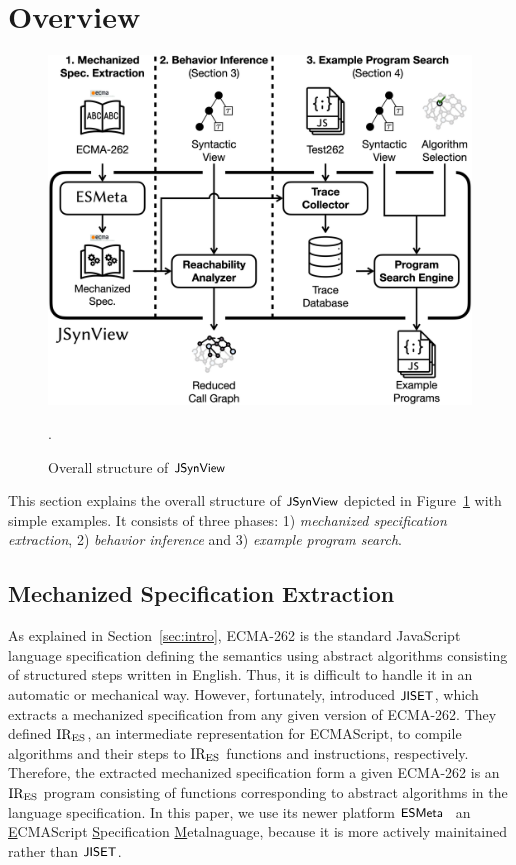 \section{Overview}\label{sec:overview}

\begin{figure}
  \centering
  \includegraphics[width=\columnwidth]{img/overall.png}
  \caption{Overall structure of $\textsf{\small JSynView}$}
  \vspace*{-1em}
  \label{fig:overall}.
\end{figure}

This section explains the overall structure of $\textsf{\small JSynView}$ depicted in
Figure~\ref{fig:overall} with simple examples.  It consists of three phases: 1)
\textit{mechanized specification extraction}, 2) \textit{behavior inference} and
3) \textit{example program search}.

\subsection{Mechanized Specification Extraction}\label{sec:extract-spec}

As explained in Section~\ref{sec:intro}, ECMA-262 is the standard JavaScript
language specification defining the semantics using abstract algorithms
consisting of structured steps written in English.  Thus, it is difficult to
handle it in an automatic or mechanical way.  However, fortunately,
\citet{jiset} introduced $\textsf{\small JISET}$, which extracts a mechanized specification
from any given version of ECMA-262.  They defined $\text{IR}_\text{ES}$, an intermediate
representation for ECMAScript, to compile algorithms and their steps to $\text{IR}_\text{ES}$
functions and instructions, respectively.  Therefore, the extracted mechanized
specification form a given ECMA-262 is an $\text{IR}_\text{ES}$ program consisting of
functions corresponding to abstract algorithms in the language specification.
In this paper, we use its newer platform $\textsf{\small ESMeta}$~\cite{esmeta} an
\underline{E}CMAScript \underline{S}pecification \underline{M}etalnaguage,
because it is more actively mainitained rather than $\textsf{\small JISET}$.


